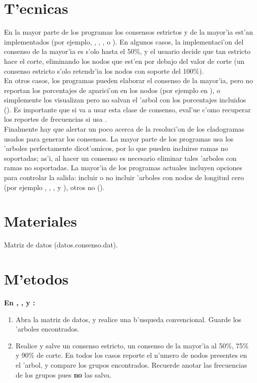 \section{T'ecnicas}
En la mayor parte de los programas los consensos estrictos y de la mayor'ia est'an implementados (por ejemplo, , , ,  o ). En algunos casos, la implementaci'on del consenso de la mayor'ia es s'olo hasta el 50\%, y el usuario decide que tan estricto hace el corte, eliminando los nodos que est'en por debajo del valor de corte (un consenso estricto s'olo retendr'ia los nodos con soporte del 100\%).\\
En otros casos, los programas pueden elaborar el consenso de la mayor'ia, pero no reportan los porcentajes de aparici'on en los nodos (por ejemplo en ), o simplemente los visualizan pero no salvan el 'arbol con los porcentajes incluidos (). Es importante que si va a usar esta clase de consenso, eval'ue c'omo recuperar los reportes de frecuencias si usa .\\
Finalmente hay que alertar un poco acerca de la resoluci'on de los cladogramas usados para generar los consensos. La mayor parte de los programas usa los 'arboles perfectamente dicot'omicos, por lo que pueden incluirse ramas no soportadas; as'i, al hacer un consenso es necesario eliminar tales 'arboles con ramas no soportadas. La mayor'ia de los programas actuales incluyen opciones para controlar la salida: incluir o no incluir 'arboles con nodos de longitud cero (por ejemplo , , ,  y ), otros no ().
\section{Materiales}
\noindent
Matriz de datos (datos.consenso.dat).
\section{M'etodos}
\noindent
\textbf{En , ,  y :}
\begin{enumerate}
\item Abra la matriz de datos, y realice una b'usqueda convencional. Guarde los 'arboles encontrados.\\
\item Realice y salve un consenso estricto, un consenso de la mayor'ia al 50\%, 75\% y 90\% de corte. En todos los casos reporte el n'umero de nodos presentes en el 'arbol, y compare los grupos encontrados. Recuerde anotar las frecuencias de los grupos pues  \textbf{no} las salva.
\end{enumerate}

